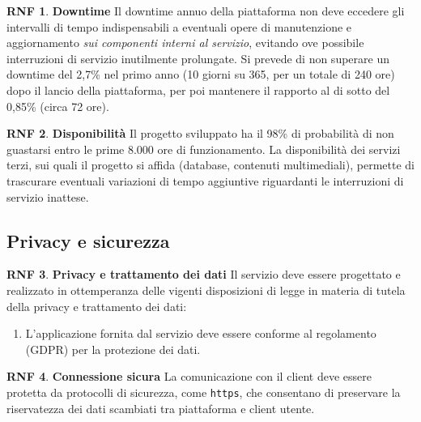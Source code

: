 \documentclass[11pt, a4paper]{article}
\theoremstyle{definition}
\newtheorem{nonfuncreq}{RNF} %
\begin{document}
\begin{nonfuncreq}
\label{downtime}
\textbf{Downtime }
Il downtime annuo della piattaforma non deve eccedere gli intervalli di
tempo indispensabili a eventuali opere di manutenzione e aggiornamento
\textit{sui componenti interni al servizio}, evitando ove possibile
interruzioni di servizio inutilmente prolungate. Si prevede di non superare
un downtime del 2,7\% nel primo anno (10 giorni su 365, per un totale di 240
ore) dopo il lancio della piattaforma, per poi mantenere il rapporto al di
sotto del 0,85\% (circa 72 ore).
\end{nonfuncreq}

\begin{nonfuncreq}
\textbf{Disponibilità }
\label{disponibilita}
Il progetto sviluppato ha il 98\% di probabilità di non guastarsi entro le
prime 8.000 ore di funzionamento. La disponibilità dei servizi terzi, sui
quali il progetto si affida (database, contenuti multimediali), permette di
trascurare eventuali variazioni di tempo aggiuntive riguardanti le
interruzioni di servizio inattese.
\end{nonfuncreq}

\subsection{Privacy e sicurezza}

\begin{nonfuncreq}
\textbf{Privacy e trattamento dei dati }
Il servizio deve essere progettato e realizzato in ottemperanza delle
vigenti disposizioni di legge in materia di tutela della privacy e
trattamento dei dati:
\begin{enumerate}
    \item L'applicazione fornita dal servizio deve essere conforme
    al regolamento \href{https://www.garanteprivacy.it/documents/10160/0/Regolamento+UE+2016+679.+Arricchito+con+riferimenti+ai+Considerando+Aggiornato+alle+rettifiche+pubblicate+sulla+Gazzetta+Ufficiale++dell%27Unione+europea+127+del+23+maggio+2018}{\textcolor{blue}{\underbar{UE n.2016/679}}} (GDPR) per la protezione dei dati.
\end{enumerate}
\end{nonfuncreq}

\begin{nonfuncreq}
\textbf{Connessione sicura }
La comunicazione con il client deve essere protetta da protocolli
di sicurezza, come \texttt{https}, che consentano di preservare la
riservatezza dei dati scambiati tra piattaforma e client utente.
\end{nonfuncreq}
\end{document}
